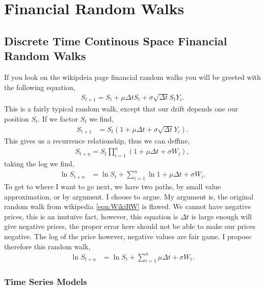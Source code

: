 \chapter{Financial Random Walks}

\section{Discrete Time Continous Space Financial Random Walks}

If you look on the wikipdeia page financial random walks you will be greeted with the following equation,
\begin{align}
    S_{t+1} = S_t + \mu \Delta t S_t + \sigma \sqrt{\Delta t} S_t Y_i. \label{eqn:WikiRW}
\end{align}
This is a fairly typical random walk, except that our drift depends one our position $S_t$. If we factor $S_t$ we find,
\begin{align*}
    S_{t+1} &= S_t\left(1 + \mu \Delta t + \sigma \sqrt{\Delta t} Y_i\right).
\end{align*}
This gives us a recurrence relationship, thus we can deffine,
\begin{align*}
    S_{t+n} = S_t\prod_{i=1}^{n}\left(1 + \mu \Delta t + \sigma  W_{i}\right),
\end{align*}
taking the log we find,
\begin{align*}
    \ln{S_{t+n}} &= \ln{S_t} + \sum_{i=1}^{n} \ln{1 + \mu \Delta t + \sigma W_i}.
\end{align*}
To get to where I want to go next, we have two paths, by small value approximation, or by argument. I choose to argue. My argument is, the original random walk from wikipedia \eqref{eqn:WikiRW} is flawed. We cannot have negative prices, this is an inutuive fact, however, this equation is $\Delta t$ is large enough will give negative prices, the proper error here should not be able to make our prices negative. The log of the price however, negative values are fair game. I propose therefore this random walk,
\begin{align}
    \ln{S_{t+n}} &= \ln{S_t} + \sum_{i=1}^{n} \mu \Delta t + \sigma W_t. \label{eqn:LogRW}
\end{align}

\subsection{Time Series Models}



